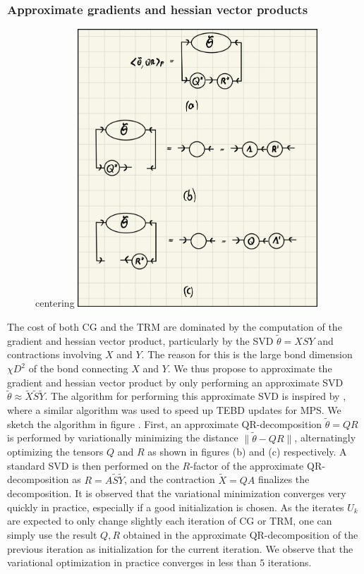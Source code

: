 \subsubsection*{Approximate gradients and hessian vector products}
\begin{figure}
	centering
	\includegraphics[width=0.8\textwidth]{figures/disoTPS/approximate_qr_decomposition.jpeg}
	\caption{}
	\label{fig:approximate_qr_decomposition}
\end{figure}
The cost of both CG and the TRM are dominated by the computation of the gradient and hessian vector product, particularly by the SVD $\tilde{\theta} = XSY$ and contractions involving $X$ and $Y$. The reason for this is the large bond dimension $\chi D^2$ of the bond connecting $X$ and $Y$. We thus propose to approximate the gradient and hessian vector product by only performing an approximate SVD $\tilde{\theta} \approx \tilde{X}\tilde{S}\tilde{Y}$. The algorithm for performing this approximate SVD is inspired by \cite{cite:fast_time_evolution_of_mps_using_qr}, where a similar algorithm was used to speed up TEBD updates for MPS. We sketch the algorithm in figure . First, an approximate QR-decomposition $\tilde{\theta} = QR$ is performed by variationally minimizing the distance $\lVert \tilde{\theta} - QR \rVert$, alternatingly optimizing the tensors $Q$ and $R$ as shown in figures (b) and (c) respectively. A standard SVD is then performed on the $R$-factor of the approximate QR-decomposition as $R = A\tilde{S}\tilde{Y}$, and the contraction $\tilde{X} = QA$ finalizes the decomposition. It is observed that the variational minimization converges very quickly in practice, especially if a good initialization is chosen. As the iterates $U_k$ are expected to only change slightly each iteration of CG or TRM, one can simply use the result $Q, R$ obtained in the approximate QR-decomposition of the previous iteration as initialization for the current iteration. We observe that the variational optimization in practice converges in less than $5$ iterations.
